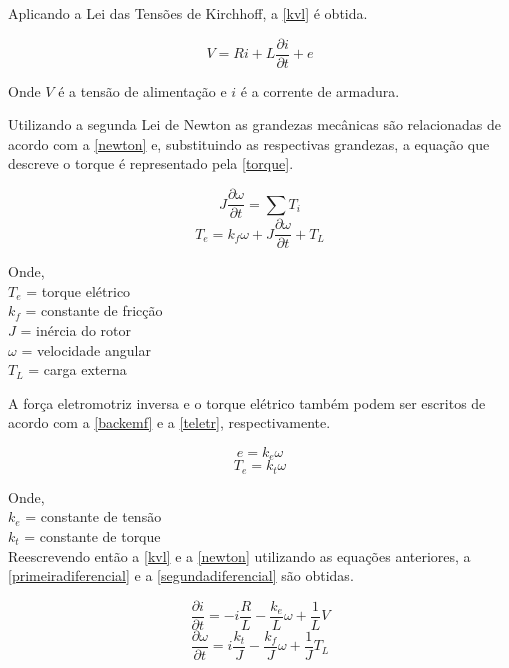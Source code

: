 \documentclass[
	12pt,				%
	openright,			%
	oneside,			%
	a4paper,			%
	english,			%
	french,				%
	spanish,			%
	brazil,				%
	]{abntex2}
\begin{document}
Aplicando a Lei das Tensões de Kirchhoff, a \autoref{kvl} é obtida.

\begin{equation}
\label{kvl}
  V = Ri + L\frac{\partial i}{\partial t} + e
\end{equation}

Onde $V$ é a tensão de alimentação e $i$ é a corrente de armadura.

Utilizando a segunda Lei de Newton as grandezas mecânicas são relacionadas de acordo com a \autoref{newton} e, substituindo as respectivas grandezas, a equação que descreve o torque é representado pela \autoref{torque}.

\begin{equation}
\label{newton}
  J\frac{\partial \omega}{\partial t} = \sum{T_i}
\end{equation}
\begin{equation}
\label{torque}
  T_e = k_f\omega + J\frac{\partial \omega}{\partial t} +T_L
\end{equation}

Onde,\\
$T_e$ = torque elétrico\\
$k_f$ = constante de fricção\\
$J$ = inércia do rotor\\
$\omega$ = velocidade angular\\
$T_L$ = carga externa

A força eletromotriz inversa e o torque elétrico também podem ser escritos de acordo com a \autoref{backemf} e a \autoref{teletr}, respectivamente.

\begin{equation}
\label{backemf}
  e = k_e\omega
\end{equation}
\begin{equation}
\label{teletr}
  T_e = k_t\omega
\end{equation}

Onde,\\
$k_e$ = constante de tensão\\
$k_t$ = constante de torque\\

Reescrevendo então a \autoref{kvl} e a \autoref{newton} utilizando as equações anteriores, a \autoref{primeiradiferencial} e a \autoref{segundadiferencial} são obtidas.

\begin{equation}
\label{primeiradiferencial}
  \frac{\partial i}{\partial t} = -i\frac{R}{L} - \frac{k_e}{L}\omega + \frac{1}{L}V
\end{equation}
\begin{equation}
\label{segundadiferencial}
  \frac{\partial \omega}{\partial t} = i \frac{k_t}{J} - \frac{k_f}{J}\omega + \frac{1}{J}T_L
\end{equation}
\end{document}
